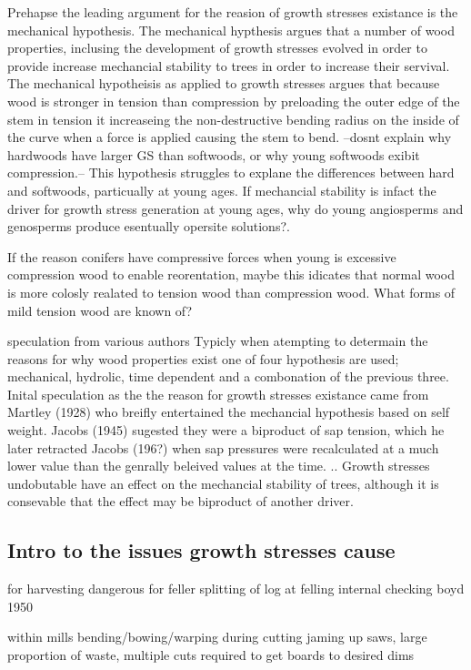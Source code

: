 \documentclass{article}
\begin{document}
Prehapse the leading argument for the reasion of growth stresses existance is
the mechanical hypothesis. The mechanical hypthesis argues that a number of wood properties,
inclusing the development of growth stresses evolved in order to provide
increase mechancial stability to trees in order to increase their servival. The
mechanical hypotheisis as applied to growth stresses argues that because wood is
stronger in tension than compression by preloading the outer edge of the stem
in tension it increaseing the non-destructive bending radius on the inside of
the curve when a force is applied causing the stem to bend. --dosnt explain why
hardwoods have larger GS than softwoods, or why young softwoods exibit
compression.-- This hypothesis struggles to explane the differences between hard
and softwoods, particually at young ages. If mechancial stability is infact the
driver for growth stress generation at young ages, why do young angiosperms and
genosperms produce esentually opersite solutions?.

If the reason conifers have compressive forces when young is excessive
compression wood to enable reorentation, maybe this idicates that normal wood is
more colosly realated to tension wood than compression wood. What forms of mild
tension wood are known of?

speculation from various authors
Typicly when atempting to determain the reasons for why wood properties exist
one of four hypothesis are used; mechanical, hydrolic, time dependent and a
combonation of the previous three. Inital speculation as the the reason for
growth stresses existance came from Martley (1928) who breifly entertained the
mechancial hypothesis based on self weight. Jacobs (1945) sugested they were a
biproduct of sap tension, which he later retracted Jacobs (196?) when sap
pressures were recalculated at a much lower value than the genrally beleived
values at the time. .. Growth stresses undobutable have an effect on the
mechancial stability of trees, although it is consevable that the effect may be
biproduct of another driver.


\subsection{Intro to the issues growth stresses cause }

for harvesting
dangerous for feller
splitting of log at felling
internal checking
boyd 1950

within mills
bending/bowing/warping during cutting jaming up saws, large proportion of waste,
multiple cuts required to get boards to desired dims
\end{document}
